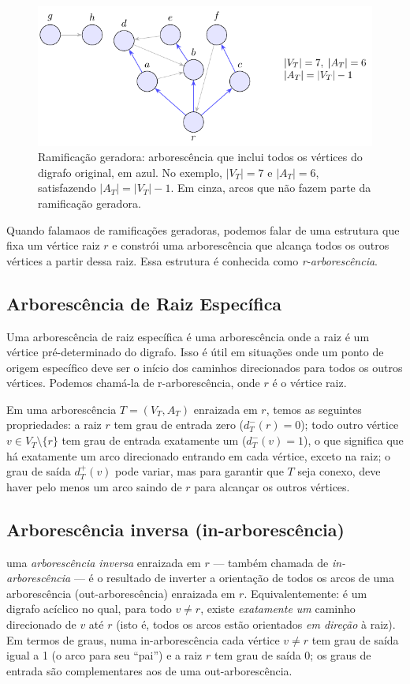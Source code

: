 \begin{figure}[H]
	\centering
	\includegraphics[width=0.9\linewidth]{figures/fig_ramificacao_geradora.pdf}

	\caption{Ramificação geradora: arborescência que inclui todos os vértices do digrafo original, em azul. No exemplo, $|V_T|=7$ e $|A_T|=6$, satisfazendo $|A_T|=|V_T|-1$. Em cinza, arcos que não fazem parte da ramificação geradora.}
	\label{fig:ramificacao-geradora}\end{figure}



Quando falamaos de ramificações geradoras, podemos falar de uma estrutura que fixa um vértice raiz \(r\) e constrói uma arborescência que alcança todos os outros vértices a partir dessa raiz. Essa estrutura é conhecida como \emph{r-arborescência}.

\subsection{Arborescência de Raiz Específica}
Uma arborescência de raiz específica é uma arborescência onde a raiz é um vértice pré-determinado do digrafo. Isso é útil em situações onde um ponto de origem específico deve ser o início dos caminhos direcionados para todos os outros vértices. Podemos chamá-la de r-arborescência, onde \(r\) é o vértice raiz.


Em uma arborescência \(T = (V_T, A_T)\) enraizada em \(r\), temos as seguintes propriedades: a raiz \(r\) tem grau de entrada zero (\(d_T^-(r) = 0\)); todo outro vértice \(v \in V_T \setminus \{r\}\) tem grau de entrada exatamente um (\(d_T^-(v) = 1\)), o que significa que há exatamente um arco direcionado entrando em cada vértice, exceto na raiz; o grau de saída \(d_T^+(v)\) pode variar, mas para garantir que \(T\) seja conexo, deve haver pelo menos um arco saindo de \(r\) para alcançar os outros vértices.\subsection{Arborescência inversa (in-arborescência)}
uma \emph{arborescência inversa} enraizada em \(r\) — também chamada de \emph{in-arborescência} — é o resultado de inverter a orientação de todos os arcos de uma arborescência (out-arborescência) enraizada em \(r\). Equivalentemente: é um digrafo acíclico no qual, para todo \(v\neq r\), existe \emph{exatamente um} caminho direcionado de \(v\) até \(r\) (isto é, todos os arcos estão orientados \emph{em direção} à raiz). Em termos de graus, numa in-arborescência cada vértice \(v\neq r\) tem grau de saída igual a 1 (o arco para seu “pai”) e a raiz \(r\) tem grau de saída 0; os graus de entrada são complementares aos de uma out-arborescência.


